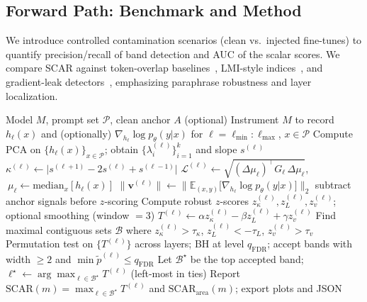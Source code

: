 \documentclass[11pt]{article}
\begin{document}
\subsection{Forward Path: Benchmark and Method}
\label{sec:scar_benchmark}
We introduce controlled contamination scenarios (clean vs.\ injected fine-tunes) to quantify precision/recall of band detection and AUC of the scalar scores. We compare SCAR against token-overlap baselines~\cite{raunak2023tokenoverlap}, LMI-style indices~\cite{lmcontamindex2025}, and gradient-leak detectors~\cite{zhang2023pretrain}, emphasizing paraphrase robustness and layer localization.

\begin{algorithm}[t]
\caption{SCAR: Rupture Detection and Scoring}
\label{alg:scar}
\begin{algorithmic}[1]
\REQUIRE Model $M$, prompt set $\mathcal{P}$, clean anchor $A$ (optional)
\STATE Instrument $M$ to record $h_\ell(x)$ and (optionally) $\nabla_{h_\ell}\log p_\theta(y|x)$ for $\ell=\ell_{\min}:\ell_{\max}$, $x\in\mathcal{P}$
\FOR{$\ell=\ell_{\min}:\ell_{\max}$}
  \STATE Compute PCA on $\{h_\ell(x)\}_{x\in\mathcal{P}}$; obtain $\{\lambda_i^{(\ell)}\}_{i=1}^k$ and slope $s^{(\ell)}$
  \STATE $\kappa^{(\ell)}\leftarrow\big|s^{(\ell+1)}-2s^{(\ell)}+s^{(\ell-1)}\big|$
  \STATE $\mathcal{L}^{(\ell)}\leftarrow\sqrt{(\Delta\mu_\ell)^\top G_\ell\,\Delta\mu_\ell}$, $\ \mu_\ell\!\leftarrow\!\mathrm{median}_x[h_\ell(x)]$
  \STATE $\|\mathbf{v}^{(\ell)}\|\leftarrow \Big\|\mathbb{E}_{(x,y)}\big[\nabla_{h_\ell}\log p_\theta(y|x)\big]\Big\|_2$
\ENDFOR
{} \STATE subtract anchor signals before $z$-scoring \ENDIF
\STATE Compute robust $z$-scores $z_\kappa^{(\ell)},z_L^{(\ell)},z_v^{(\ell)}$; optional smoothing (window $=3$)
\STATE $T^{(\ell)}\leftarrow \alpha z_\kappa^{(\ell)}-\beta z_L^{(\ell)}+\gamma z_v^{(\ell)}$
\STATE Find maximal contiguous sets $\mathcal{B}$ where $z_\kappa^{(\ell)}>\tau_\kappa$, $z_L^{(\ell)}<-\tau_L$, $z_v^{(\ell)}>\tau_v$
\STATE Permutation test on $\{T^{(\ell)}\}$ across layers; BH at level $q_{\mathrm{FDR}}$; accept bands with width $\ge 2$ and $\min \tilde p^{(\ell)}\le q_{\mathrm{FDR}}$
\STATE Let $\mathcal{B}^\star$ be the top accepted band; $\ell^\star\leftarrow \arg\max_{\ell\in\mathcal{B}^\star} T^{(\ell)}$ (left-most in ties)
\STATE Report $\mathrm{SCAR}(m)=\max_{\ell\in\mathcal{B}^\star} T^{(\ell)}$ and $\mathrm{SCAR}_{\text{area}}(m)$; export plots and JSON
\end{algorithmic}
\end{algorithm}
\end{document}
